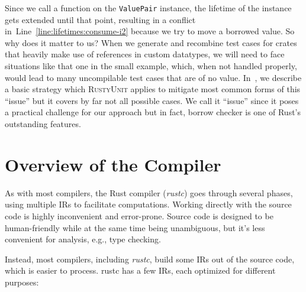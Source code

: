 \documentclass[paper=a4,%
  twoside,%
  BCOR4mm,%
  abstract=true,%
  toc=bibliography,%
  chapterprefix=true,%
  toc=bibliographynumbered,%
  open=right,%
  english,%
  pagesize=pdftex]{scrreprt}
\newcommand{\tech}{\textsc{RustyUnit}\xspace}
\begin{document}
Since we call a function on the \texttt{ValuePair} instance, the lifetime of the instance gets extended until that point, resulting in a conflict in~Line~\ref{line:lifetimes:consume-i2} because we try to move a borrowed value. So why does it matter to us? When we generate and recombine test cases for crates that heavily make use of references in custom datatypes, we will need to face situations like that one in the small example, which, when not handled properly, would lead to many uncompilable test cases that are of no value. In~, we describe a basic strategy which \tech applies to mitigate most common forms of this ``issue'' but it covers by far not all possible cases. We call it ``issue'' since it poses a practical challenge for our approach but in fact, borrow checker is one of Rust's outstanding features.

\section{Overview of the Compiler}
As with most compilers, the Rust compiler (\emph{rustc}) goes through several phases, using multiple \acp{IR} to facilitate computations. Working directly with the source code is highly inconvenient and error-prone. Source code is designed to be human-friendly while at the same time being unambiguous, but it's less convenient for analysis, e.g., type checking.

Instead, most compilers, including \emph{rustc}, build some \acp{IR} out of the source code, which is easier to process. rustc has a few \acp{IR}, each optimized for different purposes:
\end{document}
